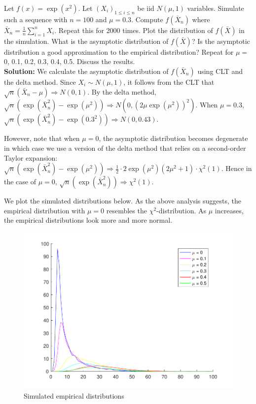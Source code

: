 \documentclass[11pt,letterpaper]{article}                  %
\begin{document}
\bigskip
\begin{problem}
Let $f(x) = \exp (x^2)$.
Let $(X_i)_{1 \leq i \leq n}$ be iid $N(\mu,1)$ variables.
Simulate such a sequence with $n = 100$ and $\mu = 0.3$.
Compute $f (\bar{X}_n)$ where $\bar{X}_n = \frac{1}{n} \sum_{i=1}^n X_i$.
Repeat this for 2000 times. Plot the distribution of $f (\bar{X})$ in the simulation.
What is the asymptotic distribution of $f (\bar{X})$?
Is the asymptotic distribution a good approximation to the empirical distribution?
Repeat for $\mu =$ 0, 0.1, 0.2, 0.3, 0.4, 0.5.
Discuss the results. \\

\textbf{Solution:}
We calculate the asymptotic distribution of $f(\bar{X}_n)$ using CLT and the delta method.
Since $X_i \sim N(\mu, 1)$, it follows from the CLT that $\sqrt{n} (\bar{X}_n - \mu) \Rightarrow N (0, 1)$.
By the delta method, $\sqrt{n} (\exp(\bar{X}_n^2) - \exp(\mu^2)) \Rightarrow N (0, (2 \mu \exp(\mu^2))^2)$.
When $\mu = 0.3$, $\sqrt{n} (\exp(\bar{X}_n^2) - \exp(0.3^2)) \Rightarrow N (0, 0.43)$.

However, note that when $\mu = 0$, the asymptotic distribution becomes degenerate in which case we use a version of the delta method that relies on a second-order Taylor expansion:
$\sqrt{n} (\exp(\bar{X}_n^2) - \exp(\mu^2)) \Rightarrow \frac{1}{2} \cdot 2 \exp(\mu^2) (2\mu^2 + 1) \cdot \chi^2(1)$.
Hence in the case of $\mu = 0$, $\sqrt{n} (\exp(\bar{X}_n^2)) \Rightarrow \chi^2(1)$.

We plot the simulated distributions below.
As the above analysis suggests, the empirical distribution with $\mu = 0$ resembles the $\chi^2$-distribution.
As $\mu$ increases, the empirical distributions look more and more normal.

\begin{figure}[H]
  \centering
  \caption{Simulated empirical distributions}
  \includegraphics[scale=0.6]{prob12.pdf}
\end{figure}
\end{problem}

\bigskip

\begin{problem}

\end{problem}
\end{document}

